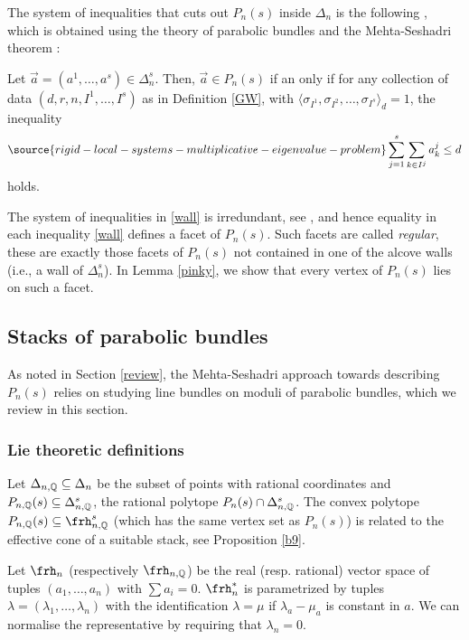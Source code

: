 The system of inequalities that cuts out $P_n(s)$ inside $\Delta_n$ is the following \cite{AW,BLocal}, which is obtained using the theory of parabolic bundles and the Mehta-Seshadri theorem \cite{MS}:
\begin{theorem}
\notready\label{ABW}
Let $\vec{a}=(a^1,\dots,a^s)\in \Delta_n^s$.
Then, $\vec{a}\in P_{n}(s)$ if an only if for any collection of data
$(d,r,n,I^1,\dots,I^s)$ as in Definition \ref{GW}, with $\langle\sigma_{I^1}, \sigma_{I^2},\dots,\sigma_{I^s}\rangle_d= 1$, the inequality
\begin{equation}\label{wall}
\source{rigid-local-systems-multiplicative-eigenvalue-problem}
\sum_{j=1}^s\sum_{k\in I^j} a_k^{j}\leq d
\end{equation}
holds.
\end{theorem}
The system of inequalities in \eqref{wall} is irredundant, see \cite[Remark 8.6]{BKq}, and hence equality in each inequality \eqref{wall} defines a facet of $P_n(s)$. Such facets are called {\em regular}, these are exactly those facets of $P_n(s)$ not contained in one of the alcove walls (i.e., a wall of $\Delta_n^s$).  In Lemma \ref{pinky}, we show that every vertex of $P_n(s)$ lies on  such a facet.

\subsection{Stacks of parabolic bundles}
As noted in Section \ref{review}, the Mehta-Seshadri approach towards describing $P_n(s)$ relies
on studying line bundles on moduli of parabolic bundles, which we review in this section.
\subsubsection{Lie theoretic definitions}\label{loudvoice}
Let $\Delta_{n,\Bbb{Q}}\subseteq \Delta_n$ be the subset of points with rational coordinates and $P_{n,\Bbb{Q}}(s)\subseteq\Delta^s_{n,\Bbb{Q}}$, the rational polytope
 $P_{n}(s)\cap \Delta^s_{n,\Bbb{Q}}$. The convex polytope $P_{n,\Bbb{Q}}(s)\subseteq \frh_{n,\Bbb{Q}}^s$ (which has the same vertex set as $P_n(s)$) is related to the effective cone of a suitable stack, see Proposition \ref{b9}.

Let $\frh_n$ (respectively $\frh_{n,\Bbb{Q}}$)  be the real (resp. rational) vector space of tuples $(a_1,\dots,a_n)$ with $\sum a_i=0$. $\frh_n^*$ is parametrized by tuples $\lambda=(\lambda_1,\dots,\lambda_n)$ with the identification $\lambda=\mu$ if $\lambda_a-\mu_a$ is constant in $a$.  We can normalise the representative by requiring that $\lambda_n=0$.


